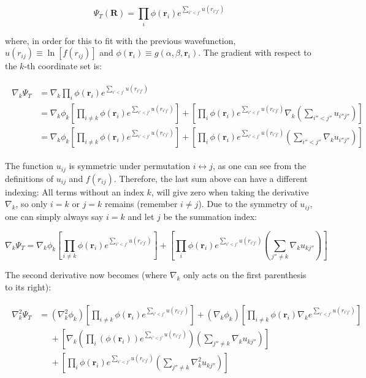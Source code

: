 \documentclass[english, a4paper]{article}
\newcommand{\bm}[1]{\mathbf{#1}}
\begin{document}
\begin{equation}
	\Psi_T(\bm{R}) = \prod_{i} \phi(\bm{r}_i)e^{\sum_{i'<j'}u(r_{i'j'})}
\end{equation}

where, in order for this to fit with the previous wavefunction, $u(r_{ij}) \equiv \ln[f(r_{ij})]$ and $\phi(\bm{r}_i) \equiv g(\alpha,\beta,\bm{r}_i)$. The gradient with respect to the $k$-th coordinate set is:

\begin{align}
	\begin{split}
	\nabla_k\Psi_T &= \nabla_k\prod_i \phi(\bm{r}_i)e^{\sum_{i'<j'}u(r_{i'j'})}\\
	&= \nabla_k\phi_k\left[\prod_{i\neq k} \phi(\bm{r}_i)e^{\sum_{i'<j'}u(r_{i'j'})}\right] + \left[\prod_i \phi(\bm{r}_i)e^{\sum_{i'<j'}u(r_{i'j'})}\nabla_k\left(\sum_{i''<j''}u_{i''j''} \right)\right]\\
	&= \nabla_k\phi_k\left[\prod_{i\neq k} \phi(\bm{r}_i)e^{\sum_{i'<j'}u(r_{i'j'})}\right] + \left[\prod_i \phi(\bm{r}_i)e^{\sum_{i'<j'}u(r_{i'j'})}\left(\sum_{i''<j''}\nabla_ku_{i''j''} \right)\right]
	\end{split}
\end{align}

The function $u_{ij}$ is symmetric under permutation $i \leftrightarrow j$, as one can see from the definitions of $u_{ij}$ and $f(r_{ij})$. Therefore, the last sum above can have a different indexing: All terms without an index $k$, will give zero when taking the derivative $\nabla_k$, so only $i=k$ or $j=k$ remains (remember $i \neq j$). Due to the symmetry of $u_{ij}$, one can simply always say $i=k$ and let $j$ be the summation index:

\begin{equation}
	\nabla_k\Psi_T = \nabla_k\phi_k\left[\prod_{i\neq k} \phi(\bm{r}_i)e^{\sum_{i'<j'}u(r_{i'j'})}\right] + \left[\prod_i \phi(\bm{r}_i)e^{\sum_{i'<j'}u(r_{i'j'})}\left(\sum_{j''\neq k}\nabla_ku_{kj''} \right)\right]
	\label{eq:grad}
\end{equation}

The second derivative now becomes (where $\nabla_k$ only acts on the first parenthesis to its right):

\begin{align}
	\begin{split}
	\nabla_k^2\Psi_T &= (\nabla_k^2\phi_k)\left[\prod_{i\neq k} \phi(\bm{r}_i)e^{\sum_{i'<j'}u(r_{i'j'})}\right] + (\nabla_k\phi_k) \left[\prod_{i\neq k}\phi(\bm{r}_i)\nabla_ke^{\sum_{i'<j'}u(r_{i'j'})}\right]\\
	&\:\:\:\:\:\: + \left[\nabla_k\left(\prod_i \left(\phi(\bm{r}_i)\right)e^{\sum_{i'<j'}u(r_{i'j'})}\right)\left(\sum_{j''\neq k}\nabla_ku_{kj''} \right)\right]\\
	&\:\:\:\:\:\: + \left[\prod_i \phi(\bm{r}_i)e^{\sum_{i'<j'}u(r_{i'j'})}\left(\sum_{j''\neq k}\nabla_k^2u_{kj''} \right)\right]
	\end{split}
\end{align}
\end{document}
